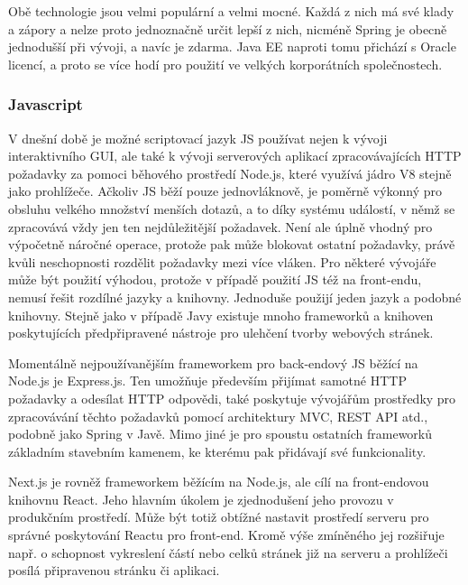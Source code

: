 		Obě technologie jsou velmi populární a velmi mocné.
		Každá z nich má své klady a zápory a nelze proto jednoznačně určit lepší z nich, nicméně Spring je obecně jednodušší při
		vývoji, a navíc je zdarma.
		Java EE naproti tomu přichází s Oracle licencí, a proto se více hodí pro použití ve velkých korporátních
		společnostech. \cite{java_ee_vs_spring}

		\subsubsection{Javascript}

		V dnešní době je možné scriptovací jazyk \ac{JS} používat nejen k vývoji interaktivního \Ac{GUI},
		ale také k vývoji serverových aplikací zpracovávajících \Ac{HTTP} požadavky za pomoci běhového prostředí Node.js,
		které využívá jádro V8 stejně jako prohlížeče. \cite{express_node_introduction}
		Ačkoliv \ac{JS} běží pouze jednovláknově, je poměrně výkonný pro obsluhu velkého množství menších dotazů, a to díky
		systému událostí, v němž se zpracovává vždy jen ten nejdůležitější požadavek.
		Není ale úplně vhodný pro výpočetně náročné operace, protože pak může blokovat ostatní požadavky, právě kvůli
		neschopnosti rozdělit požadavky mezi více vláken. \cite{js_eventloop}
		Pro některé vývojáře může být použití výhodou, protože v případě použití \ac{JS} též na front-endu,
		nemusí řešit rozdílné jazyky a knihovny.
		Jednoduše použijí jeden jazyk a podobné knihovny.
		Stejně jako v případě Javy existuje mnoho frameworků a knihoven poskytujících předpřipravené nástroje pro ulehčení
		tvorby webových stránek.

		Momentálně nejpoužívanějším frameworkem pro back-endový \ac{JS} běžící na Node.js je Express.js. \cite{state_of_js_2020}
		Ten umožňuje především přijímat samotné \Ac{HTTP} požadavky a odesílat \Ac{HTTP} odpovědi, také poskytuje vývojářům
		prostředky pro zpracovávání těchto požadavků pomocí architektury \Ac{MVC}, \Ac{REST} API atd., podobně
		jako Spring v Javě.
		Mimo jiné je pro spoustu ostatních frameworků základním stavebním kamenem, ke kterému pak přidávají
		své funkcionality. \cite{express_node_introduction}

		Next.js je rovněž frameworkem běžícím na Node.js, ale cílí na front-endovou knihovnu React.
		Jeho hlavním úkolem je zjednodušení jeho provozu v produkčním prostředí.
		Může být totiž obtížné nastavit prostředí serveru pro správné poskytování Reactu pro front-end.
		Kromě výše zmíněného jej rozšiřuje např. o schopnost vykreslení částí nebo celků stránek již na serveru a
		prohlížeči posílá připravenou stránku či aplikaci. \cite{create_nextjs_app}

